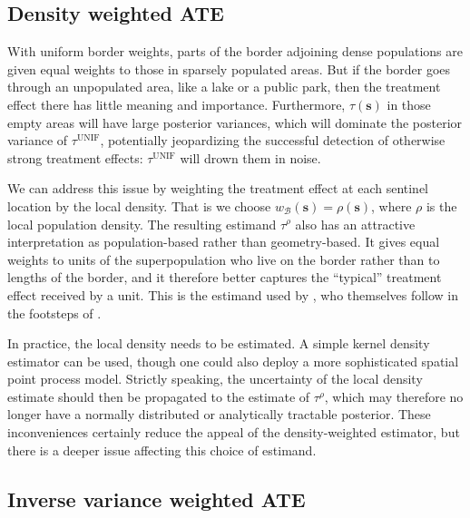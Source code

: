\documentclass[letter]{article}
\newcommand{\svec}{\mathbold{s}}
\newcommand{\border}{\mathcal{B}}
\newcommand{\unifavg}{\tau^{\mathrm{UNIF}}}
\newcommand{\taurho}{\tau^{\rho}}
\newcommand{\weightb}{w_{\border}}
\renewcommand{\cite}[1]{\citep{#1}}
\begin{document}
    	\subsection{Density weighted ATE}\label{density-weighted-ate}

With uniform border weights, parts of the border adjoining dense populations are given equal weights to those in sparsely populated areas.
But if the border goes through an unpopulated area, like a lake or a public park, then the treatment effect there has little meaning and importance.
Furthermore, \(\tau(\svec)\) in those empty areas will have large posterior variances, which will dominate the posterior variance of \(\unifavg\), potentially jeopardizing the successful detection of otherwise strong treatment effects: \(\unifavg\) will drown them in noise.

We can address this issue by weighting the treatment effect at each sentinel location by the local density.
That is we choose \(\weightb(\svec) = \rho(\svec)\), where \(\rho\) is the local population density.
The resulting estimand \(\taurho\) also has an attractive interpretation as population-based rather than geometry-based.
It gives equal weights to units of the superpopulation who live on the border rather than to lengths of the border,
and it therefore better captures the ``typical'' treatment effect received by a unit.
This is the estimand used by \cite{keele_titiunik_2015}, who themselves follow in the footsteps of \cite{imbens2011regression}.

In practice, the local density needs to be estimated.
A simple kernel density estimator can be used,
though one could also deploy a more sophisticated spatial point process model.
Strictly speaking, the uncertainty of the local density estimate should then be propagated to the estimate of \(\taurho\), which may therefore no longer have a normally distributed or analytically tractable posterior.
These inconveniences certainly reduce the appeal of the density-weighted estimator,
but there is a deeper issue affecting this choice of estimand.
    


    	\subsection{Inverse variance weighted ATE}\label{inverse-variance-weighted-ate}
\end{document}
